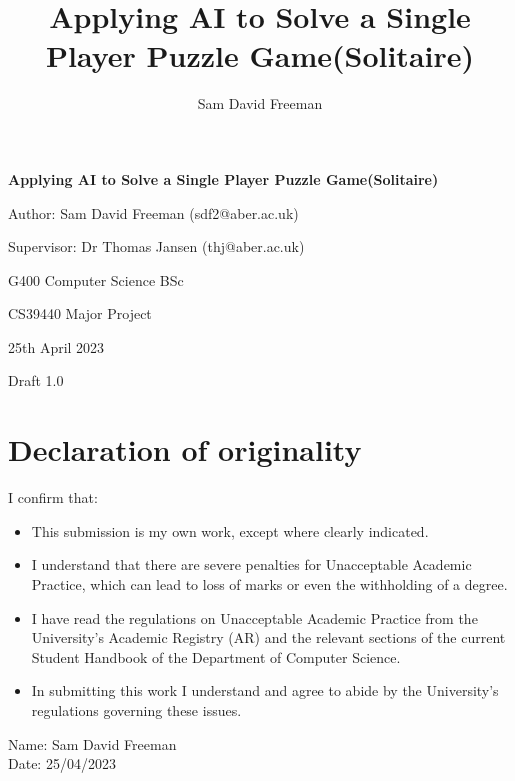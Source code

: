 \documentclass[a4paper,11pt]{article}
\title{Applying AI to Solve a Single Player Puzzle Game(Solitaire)}
\author{Sam David Freeman}
\begin{document}
\begin{center}
	\textbf{{\Large Applying AI to Solve a Single Player Puzzle Game(Solitaire)}}
\end{center}
\begin{center}
	Author: Sam David Freeman (sdf2@aber.ac.uk)
\end{center}
\begin{center}
	Supervisor: Dr Thomas Jansen (thj@aber.ac.uk)
\end{center} 
\begin{center}
	G400 Computer Science BSc
\end{center}
\begin{center}
	CS39440 Major Project
\end{center}
\begin{center}
	25th April 2023
\end{center}
\begin{center}
	Draft 1.0
\end{center}
\newpage




\section*{\centering Declaration of originality}

I confirm that:

\begin{itemize}
	\item{This submission is my own work, except where 
		clearly indicated.}
	
	\item{I understand that there are severe penalties for Unacceptable Academic Practice, which can lead to loss of marks or even the withholding of a degree.}
	
	\item{I have read the regulations on Unacceptable Academic Practice from the University's Academic Registry (AR) and the relevant sections of the current Student Handbook of the Department of Computer Science.}
	
	\item{In submitting this work I understand and agree to abide by the University's regulations governing these issues.}
\end{itemize}

\vspace{2em}
Name: Sam David Freeman  \\

\vspace{1em}
Date: 25/04/2023 \\
\newpage
\end{document}
